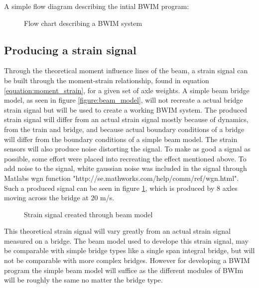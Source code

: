 A simple flow diagram describing the intial BWIM program:
\begin{figure}[H]
	\begin{adjustbox}{center}
		
	\end{adjustbox}
	\caption{Flow chart describing a BWIM system}
\end{figure}

\subsection{Producing a strain signal}
Through the theoretical moment influence lines of the beam, a strain signal can be built through the moment-strain relationship, found in equation \ref{equation:moment_strain}, for a given set of axle weights. A simple beam bridge model, as seen in figure \ref{figure:beam_model}, will not recreate a actual bridge strain signal but will be used to create a working BWIM system. The produced strain signal will differ from an actual strain signal mostly because of dynamics, from the train and bridge, and because actual boundary conditions of a bridge will differ from the boundary conditions of a simple beam model. The strain sensors will also produce noise distorting the signal.
To make as good a signal as possible, some effort were placed into recreating the effect mentioned above. To add noise to the signal, white gaussian noise was included in the signal through Matlabs wgn function "http://se.mathworks.com/help/comm/ref/wgn.html". Such a produced signal can be seen in figure \ref{fig:strainCreated}, which is produced by 8 axles moving across the bridge at 20 m/s.

\begin{figure}[H]
	\begin{adjustbox}{center}
		
	\end{adjustbox}
	\caption{Strain signal created through beam model}
	\label{fig:strainCreated}
\end{figure}

This theoretical strain signal will vary greatly from an actual strain signal measured on a bridge. The beam model used to develope this strain signal, may be comparable with simple bridge types like a single span integral bridge, but will not be comparable with more complex bridges.
However for developing a BWIM program the simple beam model will suffice as the different modules of BWIm will be roughly the same no matter the bridge type.
